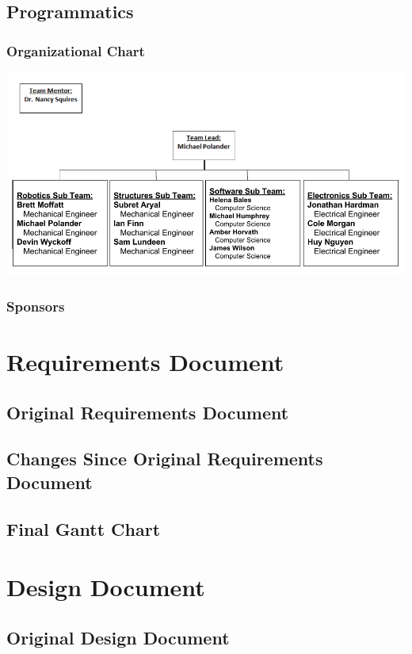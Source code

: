 \documentclass[letterpaper,10pt]{article}
\begin{document}
\subsection{Programmatics}
\subsubsection{Organizational Chart}
\includegraphics[width=\textwidth]{./images/orgChart.png}

\subsubsection{Sponsors}

\section{Requirements Document}
\subsection{Original Requirements Document}

\subsection{Changes Since Original Requirements Document}
\subsection{Final Gantt Chart}

\section{Design Document}
\subsection{Original Design Document}

\end{document}
